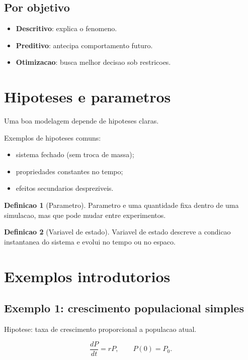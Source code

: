 \documentclass[12pt,a4paper,oneside]{book}
\theoremstyle{definition}
\newtheorem{definition}{Definicao}[chapter]
\begin{document}
\subsection{Por objetivo}

\begin{itemize}
    \item \textbf{Descritivo}: explica o fenomeno.
    \item \textbf{Preditivo}: antecipa comportamento futuro.
    \item \textbf{Otimizacao}: busca melhor decisao sob restricoes.
\end{itemize}

\section{Hipoteses e parametros}

Uma boa modelagem depende de hipoteses claras.

Exemplos de hipoteses comuns:
\begin{itemize}
    \item sistema fechado (sem troca de massa);
    \item propriedades constantes no tempo;
    \item efeitos secundarios despreziveis.
\end{itemize}

\begin{definition}[Parametro]
Parametro e uma quantidade fixa dentro de uma simulacao, mas que pode mudar entre experimentos.
\end{definition}

\begin{definition}[Variavel de estado]
Variavel de estado descreve a condicao instantanea do sistema e evolui no tempo ou no espaco.
\end{definition}

\section{Exemplos introdutorios}

\subsection{Exemplo 1: crescimento populacional simples}

Hipotese: taxa de crescimento proporcional a populacao atual.

\begin{equation}
\frac{dP}{dt}=rP, \qquad P(0)=P_0.
\end{equation}
\end{document}

